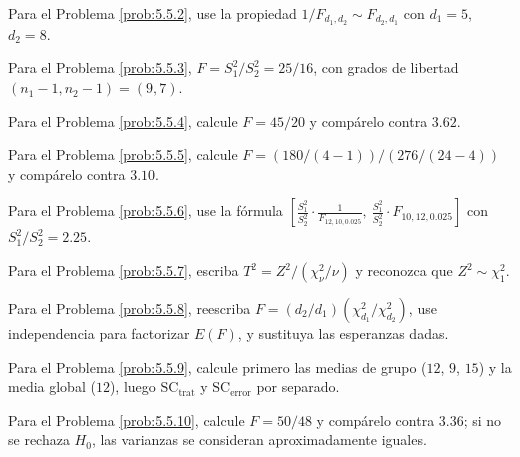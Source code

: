 \begin{sugerencia}
	\label{sug:5.5.2}
	Para el Problema \ref{prob:5.5.2}, use la propiedad $1/F_{d_1,d_2}\sim F_{d_2,d_1}$ con $d_1=5$, $d_2=8$.
\end{sugerencia}

\begin{sugerencia}
	\label{sug:5.5.3}
	Para el Problema \ref{prob:5.5.3}, $F=S_1^2/S_2^2=25/16$, con grados de libertad $(n_1-1,n_2-1)=(9,7)$.
\end{sugerencia}

\begin{sugerencia}
	\label{sug:5.5.4}
	Para el Problema \ref{prob:5.5.4}, calcule $F=45/20$ y compárelo contra $3.62$.
\end{sugerencia}

\begin{sugerencia}
	\label{sug:5.5.5}
	Para el Problema \ref{prob:5.5.5}, calcule $F=(180/(4-1))/(276/(24-4))$ y compárelo contra $3.10$.
\end{sugerencia}

\begin{sugerencia}
	\label{sug:5.5.6}
	Para el Problema \ref{prob:5.5.6}, use la fórmula $\left[\frac{S_1^2}{S_2^2}\cdot\frac{1}{F_{12,10,0.025}},\ \frac{S_1^2}{S_2^2}\cdot F_{10,12,0.025}\right]$ con $S_1^2/S_2^2=2.25$.
\end{sugerencia}

\begin{sugerencia}
	\label{sug:5.5.7}
	Para el Problema \ref{prob:5.5.7}, escriba $T^2=Z^2/(\chi^2_\nu/\nu)$ y reconozca que $Z^2\sim\chi^2_1$.
\end{sugerencia}

\begin{sugerencia}
	\label{sug:5.5.8}
	Para el Problema \ref{prob:5.5.8}, reescriba $F=(d_2/d_1)(\chi^2_{d_1}/\chi^2_{d_2})$, use independencia para factorizar $E(F)$, y sustituya las esperanzas dadas.
\end{sugerencia}

\begin{sugerencia}
	\label{sug:5.5.9}
	Para el Problema \ref{prob:5.5.9}, calcule primero las medias de grupo ($12$, $9$, $15$) y la media global ($12$), luego $\text{SC}_{\text{trat}}$ y $\text{SC}_{\text{error}}$ por separado.
\end{sugerencia}

\begin{sugerencia}
	\label{sug:5.5.10}
	Para el Problema \ref{prob:5.5.10}, calcule $F=50/48$ y compárelo contra $3.36$; si no se rechaza $H_0$, las varianzas se consideran aproximadamente iguales.
\end{sugerencia}


